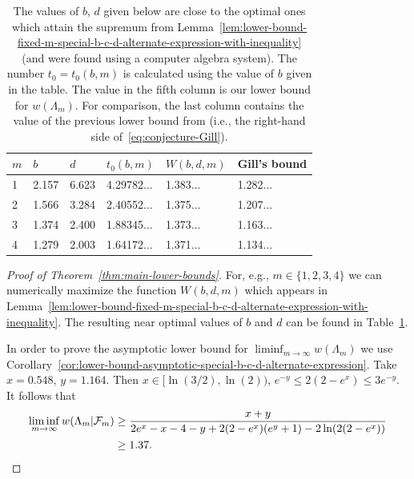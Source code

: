 \documentclass[a4paper]{amsart} %
\theoremstyle{definition}
\theoremstyle{remark}
\numberwithin{equation}{section}
\newcommand*{\weakconst}[1]{w(#1)} %
\newcommand*{\weakconstrestricted}[2]{w(#1|#2)} %
\newcommand*{\fclassspec}[1]{\mathcal{F}_{#1}}
\newcommand*{\XXXspecialbd}{W}
\begin{document}
%
%
%
%
%
\begin{table}[b] 
	\centering
	\caption{
		The values of $b$, $d$ given below are close to the optimal ones 
		which attain the supremum from
		Lemma~\ref{lem:lower-bound-fixed-m-special-b-c-d-alternate-expression-with-inequality}
		(and were found using a computer algebra system).
		The number $t_0=t_0(b,m)$ is calculated using the 
		value of $b$ given in the table.
		The value in the fifth column is our lower bound for $\weakconst{\Lambda_m}$.
		For comparison, the last column contains the value of the previous lower bound from \cite[Conjecture~1]{MR2677626} (i.e., the right-hand side of~\eqref{eq:conjecture-Gill}).
	}
	\begin{tabular}{llllll}
		\toprule
		$m$ & $b$  & $d$ & $t_0(b,m)$ & $\XXXspecialbd(b,d,m)$ & Gill's bound \\ 
		\midrule
		1  &  2.157  & 6.623  & 4.29782...  & 1.383...  & 1.282...\\
		2 & 1.566 & 3.284  & 2.40552...  & 1.375... & 1.207... \\
		3 & 1.374  & 2.400  & 1.88345... & 1.373... & 1.163...\\
		4 & 1.279 & 2.003   & 1.64172...  & 1.371...   & 1.134... \\ 	  	  	 
		\bottomrule
	\end{tabular}
	\label{table:small-m}
\end{table}
%
%
%
%
%


\begin{proof}[Proof of Theorem~\ref{thm:main-lower-bounds}]
For, e.g., $m\in\{1,2,3,4\}$ we can numerically maximize the function $\XXXspecialbd(b,d,m)$
which appears in Lemma~\ref{lem:lower-bound-fixed-m-special-b-c-d-alternate-expression-with-inequality}.
The resulting near optimal values of $b$ and $d$ can be found in Table~\ref{table:small-m}.

In order to prove the asymptotic lower bound for  $\liminf_{m\to \infty} \weakconst{\Lambda_m}$ we use Corollary~\ref{cor:lower-bound-asymptotic-special-b-c-d-alternate-expression}.
Take  $x = 0.548$, $y= 1.164$. %
Then $x\in [\ln(3/2), \ln(2))$, $e^{-y} \leq 2(2-e^x) \leq 3e^{-y}$.
It follows that 
\begin{align*}
\liminf_{m\to \infty} \weakconstrestricted{\Lambda_m}{\fclassspec{m}}
&\geq \frac{x + y}{2e^x - x -4  - y + 2(2-e^x) (e^y + 1) -2\ln(2(2-e^x))}\\
&\geq 1.37.\qedhere
\end{align*}
 \end{proof}
\end{document}
